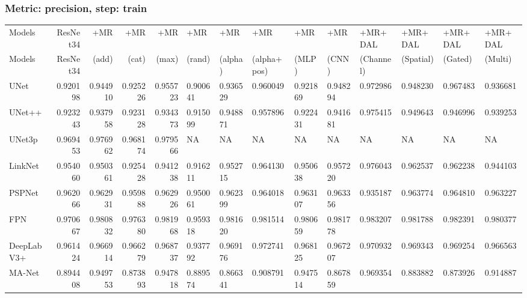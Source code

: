 \documentclass{article}
\begin{document}
\subsubsection{Metric: precision, step: train}
\begin{tabular}{lrrrrlllllllll}
\toprule
Models & ResNet34 & +MR  & +MR  & +MR  & +MR  & +MR  & +MR  & +MR  & +MR  & +MR+DAL & +MR+DAL & +MR+DAL & +MR+DAL \\
Models & ResNet34 &  (add) &  (cat) &  (max) &  (rand) &  (alpha) &  (alpha+pos) &  (MLP) &  (CNN) & (Channel) & (Spatial) & (Gated) & (Multi) \\
\midrule
UNet & 0.920198 & 0.944910 & 0.925226 & 0.955723 & 0.900641 & 0.936529 & 0.960049 & 0.921869 & 0.948294 & 0.972986 & 0.948230 & 0.967483 & 0.936681 \\
UNet++ & 0.923243 & 0.937958 & 0.923128 & 0.934373 & 0.915099 & 0.948871 & 0.957896 & 0.922431 & 0.941681 & 0.975415 & 0.949643 & 0.946996 & 0.939253 \\
UNet3p & 0.969453 & 0.976962 & 0.968174 & 0.979566 & NA & NA & NA & NA & NA & NA & NA & NA & NA \\
LinkNet & 0.954060 & 0.950361 & 0.925428 & 0.941238 & 0.916211 & 0.952715 & 0.964130 & 0.950638 & 0.957220 & 0.976043 & 0.962537 & 0.962238 & 0.944103 \\
PSPNet & 0.962066 & 0.962931 & 0.959888 & 0.962926 & 0.950061 & 0.962399 & 0.964018 & 0.963107 & 0.963356 & 0.935187 & 0.963774 & 0.964810 & 0.963227 \\
FPN & 0.970667 & 0.980832 & 0.976380 & 0.981968 & 0.959318 & 0.981620 & 0.981514 & 0.980659 & 0.981778 & 0.983207 & 0.981788 & 0.982391 & 0.980377 \\
DeepLabV3+ & 0.961424 & 0.966914 & 0.966279 & 0.968737 & 0.937792 & 0.969176 & 0.972741 & 0.968125 & 0.967207 & 0.970932 & 0.969343 & 0.969254 & 0.966563 \\
MA-Net & 0.894408 & 0.949753 & 0.873893 & 0.947818 & 0.889574 & 0.866341 & 0.908791 & 0.947514 & 0.867859 & 0.969354 & 0.883882 & 0.873926 & 0.914887 \\
\bottomrule
\end{tabular}
\end{document}
